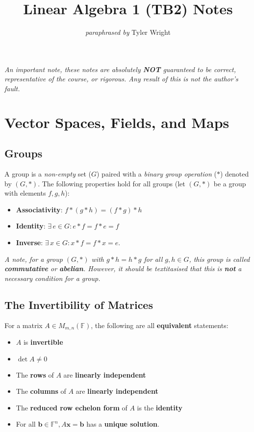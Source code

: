 \documentclass[a4paper, 12pt, twoside]{article}
\begin{document}
\title{Linear Algebra 1 (TB2) Notes}
\date{}
\author{\textit{paraphrased by} Tyler Wright}
\maketitle

\vfill

\textit{An important note, these notes are absolutely \textbf{NOT}
  guaranteed to be correct, representative of the course, or rigorous.
  Any result of this is not the author's fault.}

\newpage

\section{Vector Spaces, Fields, and Maps}

\subsection{Groups}

A group is a \textit{non-empty} set ($G$) paired with a
\textit{binary group operation} ($*$) denoted by $(G, *)$.
The following properties hold for all groups (let $(G, *)$
be a group with elements $f, g, h$):

\begin{itemize}
  \item \textbf{Associativity}: $f * (g * h) = (f * g) * h$
  \item \textbf{Identity}: $\exists \, e \in G : e * f = f * e = f$
  \item \textbf{Inverse}: $\exists \, x \in G : x * f = f * x = e$.
\end{itemize}

\textit{A note, for a group $(G, *)$ with $g * h = h * g$ for all $g, h \in G$,
  this group is called \textbf{commutative} or \textbf{abelian}. However, it
  should be textitasised that this is \textbf{not} a necessary condition for
  a group.}

\subsection{The Invertibility of Matrices}

For a matrix $A \in M_{m, n}( \mathbb{F} )$, the following are all
\textbf{equivalent} statements:

\begin{itemize}
  \item $A$ is \textbf{invertible}
  \item $\det{A} \neq 0$
  \item The \textbf{rows} of $A$ are \textbf{linearly independent}
  \item The \textbf{columns} of $A$ are \textbf{linearly independent}
  \item The \textbf{reduced row echelon form} of $A$ is the \textbf{identity}
  \item For all $\textbf{b} \in \mathbb{F}^n, A\textbf{x} = \textbf{b}$ has
        a \textbf{unique solution}.
\end{itemize}
\end{document}
